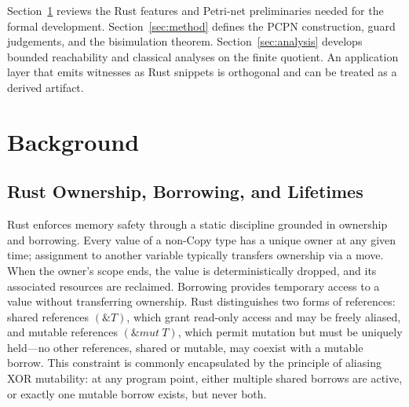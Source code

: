 \documentclass[runningheads]{llncs}
\begin{document}
Section~\ref{sec:background} reviews the Rust features and Petri-net preliminaries needed for the formal development. 
Section~\ref{sec:method} defines the PCPN construction, guard judgements, and the bisimulation theorem.
Section~\ref{sec:analysis} develops bounded reachability and classical analyses on the finite quotient.
An application layer that emits witnesses as Rust snippets is orthogonal and can be treated as a derived artifact.

\section{Background}
\label{sec:background}

\subsection{Rust Ownership, Borrowing, and Lifetimes}
\label{sec:background:rust}
Rust enforces memory safety through a static discipline grounded in ownership and borrowing. Every value of a non-Copy type has a unique owner at any given time; assignment to another variable typically transfers ownership via a move. When the owner’s scope ends, the value is deterministically dropped, and its associated resources are reclaimed. Borrowing provides temporary access to a value without transferring ownership. Rust distinguishes two forms of references: shared references $(\&T)$, which grant read-only access and may be freely aliased, and mutable references $(\&mut\ T)$, which permit mutation but must be uniquely held—no other references, shared or mutable, may coexist with a mutable borrow. This constraint is commonly encapsulated by the principle of aliasing XOR mutability: at any program point, either multiple shared borrows are active, or exactly one mutable borrow exists, but never both.
\end{document}
